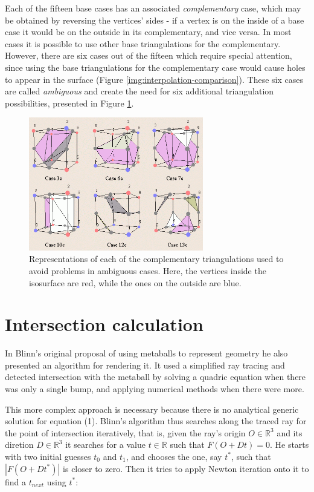 \documentclass[conference]{acmsiggraph}
\begin{document}
Each of the fifteen base cases has an associated \textit{complementary} case, which may be obtained by reversing the vertices' sides - if a vertex is on the inside of a base case it would be on the outside in its complementary, and vice versa. In most cases it is possible to use other base triangulations for the complementary. However, there are six cases out of the fifteen which require special attention, since using the base triangulations for the complementary case would cause holes to appear in the surface (Figure \ref{img:interpolation-comparison}). These six cases are called \textit{ambiguous} and create the need for six additional triangulation possibilities, presented in Figure \ref{img:ambiguous-cases}.

\begin{figure}[ht]
  \centering
  \includegraphics[width=3in]{images/ambiguous-cases}
  \caption{Representations of each of the complementary triangulations used to avoid problems in ambiguous cases. Here, the vertices inside the isosurface are red, while the ones on the outside are blue.}
  \label{img:ambiguous-cases}
\end{figure}

\section{Intersection calculation}

In Blinn's  original proposal of using
metaballs to represent geometry he also presented an algorithm for rendering it.
It used a simplified ray tracing and detected intersection with the metaball
by solving a quadric equation when there was only a single bump, and applying
numerical methods when there were more.

This more complex approach is necessary because there is no analytical generic
solution for equation (1). Blinn's algorithm thus searches along the traced ray
for the point of intersection iteratively, that is, given the ray's origin
$O\in\mathbb{R}^3$ and its diretion $D\in\mathbb{R}^3$ it searches for a value
$t\in\mathbb{R}$ such that $F(O+Dt) = 0$. He starts with two initial guesses
$t_0$ and $t_1$, and chooses the one, say $t^*$, such that $|F(O+Dt^*)|$ is
closer to zero. Then it tries to apply Newton iteration onto it to find a
$t_{next}$ using $t^*$:
\end{document}
